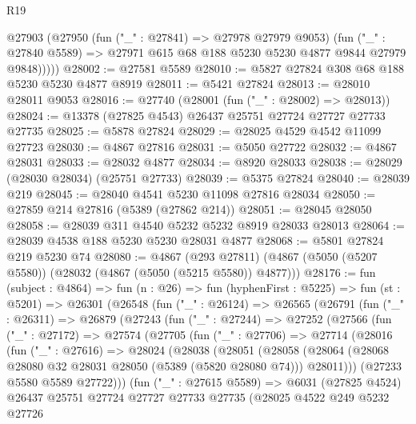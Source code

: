 \begin{lexlean}{R19}
\begin{coremodule}
        @27903
          (@27950
            (fun ("_" : @27841) => @27978 @27979 @9053)
            (fun ("_" : @27840 @5589) =>
            @27971 @615 @68 @188 @5230 @5230 @4877 @9844 @27979 @9848)))))
@28002 := @27581 @5589
@28010 := @5827 @27824 @308 @68 @188 @5230 @5230 @4877 @8919
@28011 := @5421 @27824
@28013 := @28010 @28011 @9053
@28016 := @27740 (@28001 (fun ("_" : @28002) => @28013))
@28024 := @13378 (@27825 @4543) @26437 @25751 @27724 @27727 @27733 @27735
@28025 := @5878 @27824
@28029 := @28025 @4529 @4542 @11099 @27723
@28030 := @4867 @27816
@28031 := @5050 @27722
@28032 := @4867 @28031
@28033 := @28032 @4877
@28034 := @8920 @28033
@28038 := @28029 (@28030 @28034) (@25751 @27733)
@28039 := @5375 @27824
@28040 := @28039 @219
@28045 := @28040 @4541 @5230 @11098 @27816 @28034
@28050 := @27859 @214 @27816 (@5389 (@27862 @214))
@28051 := @28045 @28050
@28058 := @28039 @311 @4540 @5232 @5232 @8919 @28033 @28013
@28064 := @28039 @4538 @188 @5230 @5230 @28031 @4877
@28068 := @5801 @27824 @219 @5230 @74
@28080 := @4867
    (@293 @27811)
    (@4867 (@5050 (@5207 @5580)) (@28032 (@4867 (@5050 (@5215 @5580)) @4877)))
@28176 := fun (subject : @4864) =>
  fun (n : @26) =>
  fun (hyphenFirst : @5225) =>
  fun (st : @5201) =>
  @26301
    (@26548
      (fun ("_" : @26124) =>
      @26565
        (@26791
          (fun ("_" : @26311) =>
          @26879
            (@27243
              (fun ("_" : @27244) =>
              @27252
                (@27566
                  (fun ("_" : @27172) =>
                  @27574
                    (@27705
                      (fun ("_" : @27706) =>
                      @27714
                        (@28016
                          (fun ("_" : @27616) =>
                          @28024
                            (@28038
                              (@28051
                                (@28058
                                  (@28064
                                    (@28068 @28080 @32 @28031 @28050 (@5389 (@5820 @28080 @74)))
                                    @28011)))
                              (@27233 @5580 @5589 @27722)))
                          (fun ("_" : @27615 @5589) =>
                          @6031
                            (@27825 @4524)
                            @26437
                            @25751
                            @27724
                            @27727
                            @27733
                            @27735
                            (@28025
                              @4522
                              @249
                              @5232
                              @27726

\end{coremodule}
\end{lexlean}

